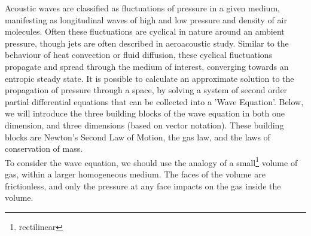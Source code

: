 Acoustic waves are classified as fluctuations of pressure in a given medium, manifesting as longitudinal waves of high and low pressure and density of air molecules. Often these fluctuations are cyclical in nature around an ambient pressure, though jets are often described in aeroacoustic study. Similar to the behaviour of heat convection or fluid diffusion, these cyclical fluctuations propagate and spread through the medium of interest, converging towards an entropic steady state. It is possible to calculate an approximate solution to the propagation of pressure through a space, by solving a system of second order partial differential equations that can be collected into a 'Wave Equation'. Below, we will introduce the three building blocks of the wave equation in both one dimension, and three dimensions (based on vector notation). These building blocks are Newton's Second Law of Motion, the gas law, and the laws of conservation of mass.\\

To consider the wave equation, we should use the analogy of a small\footnote{rectilinear} volume of gas, within a larger homogeneous medium. The faces of the volume are frictionless, and only the pressure at any face impacts on the gas inside the volume.\\


